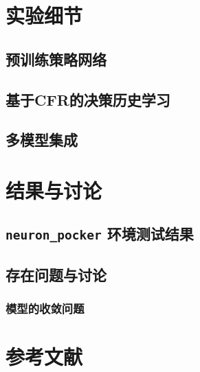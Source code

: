 \documentclass[11pt]{article}
\begin{document}
\section{实验细节}
\label{sec:orgb4e5d8d}
\subsection{预训练策略网络}
\label{sec:org9328ea4}
\subsection{基于CFR的决策历史学习}
\label{sec:org32c6ee0}
\subsection{多模型集成}
\label{sec:orga37efbc}
\section{结果与讨论}
\label{sec:org67e00d4}
\subsection{\texttt{neuron\_pocker} 环境测试结果}
\label{sec:org5620382}
\subsection{存在问题与讨论}
\label{sec:org5b913f4}
\subsubsection{模型的收敛问题}
\label{sec:orgaad24c7}
\subsubsection{}
\label{sec:org109b4fe}
\section{参考文献}
\label{sec:orgf73946a}
\end{document}
